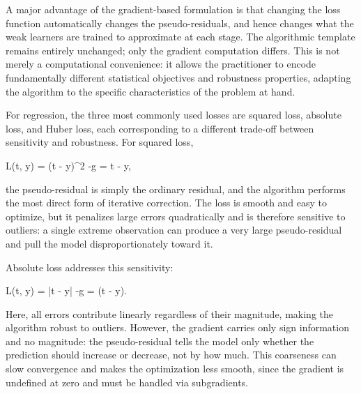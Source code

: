 A major advantage of the gradient-based formulation is that changing the loss function automatically changes the pseudo-residuals, and hence changes what the weak learners are trained to approximate at each stage. The algorithmic template remains entirely unchanged; only the gradient computation differs. This is not merely a computational convenience: it allows the practitioner to encode fundamentally different statistical objectives and robustness properties, adapting the algorithm to the specific characteristics of the problem at hand.

For regression, the three most commonly used losses are squared loss, absolute loss, and Huber loss, each corresponding to a different trade-off between sensitivity and robustness. For squared loss,
\begin{myequation}
L(t, y) = (t - y)^2 \qquad \Rightarrow \qquad -g = t - y,
\end{myequation}
the pseudo-residual is simply the ordinary residual, and the algorithm performs the most direct form of iterative correction. The loss is smooth and easy to optimize, but it penalizes large errors quadratically and is therefore sensitive to outliers: a single extreme observation can produce a very large pseudo-residual and pull the model disproportionately toward it.

Absolute loss addresses this sensitivity:
\begin{myequation}
L(t, y) = |t - y| \qquad \Rightarrow \qquad -g = (t - y).
\end{myequation}
Here, all errors contribute linearly regardless of their magnitude, making the algorithm robust to outliers. However, the gradient carries only sign information and no magnitude: the pseudo-residual tells the model only whether the prediction should increase or decrease, not by how much. This coarseness can slow convergence and makes the optimization less smooth, since the gradient is undefined at zero and must be handled via subgradients.

